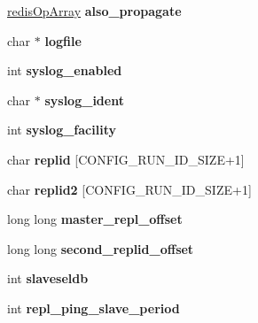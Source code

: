 \begin{DoxyCompactItemize}
\begin{tabbing}
\end{tabbing}\item 
\mbox{\label{structredisServer_abcaa85a0442288ba52e61ab0ce7bb870}} 
\hyperlink{structredisOpArray}{redis\+Op\+Array} {\bfseries also\+\_\+propagate}
\item 
\mbox{\label{structredisServer_acdbfc33ef589cd01f5f1c4eea0d9e705}} 
char $\ast$ {\bfseries logfile}
\item 
\mbox{\label{structredisServer_ae17e51d0bb3aab2ec8a0c0cf7442e94f}} 
int {\bfseries syslog\+\_\+enabled}
\item 
\mbox{\label{structredisServer_a6aa485d5f661b03d5cd7d38ff85eed93}} 
char $\ast$ {\bfseries syslog\+\_\+ident}
\item 
\mbox{\label{structredisServer_ae899a6e4591dedc512ebe1f1b6bafeff}} 
int {\bfseries syslog\+\_\+facility}
\item 
\mbox{\label{structredisServer_a8b8d9b773bafd62ce14e81b5f96c6c6c}} 
char {\bfseries replid} \mbox{[}C\+O\+N\+F\+I\+G\+\_\+\+R\+U\+N\+\_\+\+I\+D\+\_\+\+S\+I\+ZE+1\mbox{]}
\item 
\mbox{\label{structredisServer_af90c075e99f67ac11dff1b7058e7633c}} 
char {\bfseries replid2} \mbox{[}C\+O\+N\+F\+I\+G\+\_\+\+R\+U\+N\+\_\+\+I\+D\+\_\+\+S\+I\+ZE+1\mbox{]}
\item 
\mbox{\label{structredisServer_aa057539130369c7783345ea82ea30364}} 
long long {\bfseries master\+\_\+repl\+\_\+offset}
\item 
\mbox{\label{structredisServer_aafa26a3dfc41127af74ddf34b4a518eb}} 
long long {\bfseries second\+\_\+replid\+\_\+offset}
\item 
\mbox{\label{structredisServer_afe78e4e80a36504c23fb1e19f62ddd61}} 
int {\bfseries slaveseldb}
\item 
\mbox{\label{structredisServer_a46fa7cdd2a1d9f3fb39f19126c7f4b21}} 
int {\bfseries repl\+\_\+ping\+\_\+slave\+\_\+period}

\end{DoxyCompactItemize}
